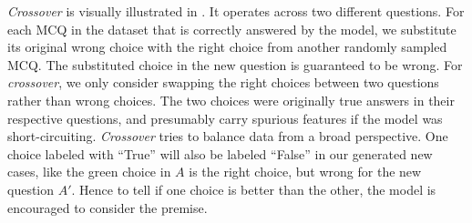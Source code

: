 \textit{Crossover} is visually illustrated in . It operates across two different questions.
For each MCQ in the dataset that is correctly answered by the model, 
we substitute its original wrong choice with the right choice from 
another randomly sampled MCQ. The substituted choice in the new  
question is guaranteed to be wrong. For \textit{crossover}, we only consider swapping the right choices between two questions 
rather than wrong choices. The two choices were originally true answers in their respective questions,
and presumably carry spurious features if the model was short-circuiting. 
\textit{Crossover} tries to balance data from a broad perspective.
One choice labeled with ``True'' 
will also be labeled ``False'' in our generated new cases, like the green choice in $A$ is the right choice, 
but wrong for the new question ${A}'$. 
Hence to tell if one choice is better than the other, the model is encouraged to
consider the premise. 

